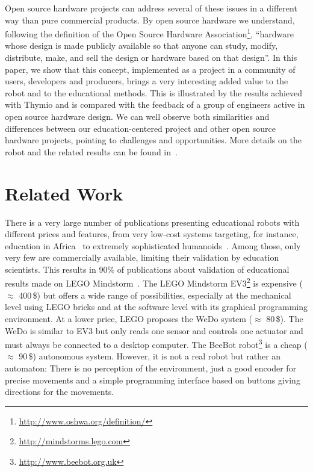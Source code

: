 \documentclass[letterpaper, 10 pt, conference]{ieeeconf}  %
\begin{document}
Open source hardware projects can address several of these issues in a different way than pure commercial products. 
By open source hardware we understand, following the definition of the Open Source Hardware Association\footnote{\url{http://www.oshwa.org/definition/}}, ``hardware whose design is made publicly available so that anyone can study, modify, distribute, make, and sell the design or hardware based on that design''.
In this paper, we show that this concept, implemented as a project in a community of users, developers and producers, brings a very interesting added value to the robot and to the educational methods. 
This is illustrated by the results achieved with Thymio and is compared with the feedback of a group of engineers active in open source hardware design.
We can well observe both similarities and differences between our education-centered project and other open source hardware projects, pointing to challenges and opportunities.
More details on the robot and the related results can be found in~\cite{RiedoPhD, magnenat2014}.  

\section{Related Work}

There is a very large number of publications presenting educational robots with different prices and features, from very low-cost systems targeting, for instance, education in Africa~\cite{Rubenstein2015,Gyebi2015} to extremely sophisticated humanoids~\cite{Hood2015,Mazzoni2016}.
Among those, only very few are commercially available, limiting their validation by education scientists.
This results in 90\% of publications about validation of educational results made on LEGO Mindstorm~\cite{benitti2012exploring}.
The LEGO Mindstorm EV3\footnote{\url{http://mindstorms.lego.com}} is expensive ($\approx$ 400\,\$) but offers a wide range of possibilities, especially at the mechanical level using LEGO bricks and at the software level with its graphical programming environment. 
At a lower price, LEGO proposes the WeDo system ($\approx$ 80\,\$).
The WeDo is similar to EV3 but only reads one sensor and controls one actuator and must always be connected to a desktop computer.
The BeeBot robot\footnote{\url{http://www.beebot.org.uk}} is a cheap ($\approx$ 90\,\$) autonomous system.
However, it is not a real robot but rather an automaton: There is no perception of the environment, just a good encoder for precise movements and a simple programming interface based on buttons giving directions for the movements.
\end{document}
